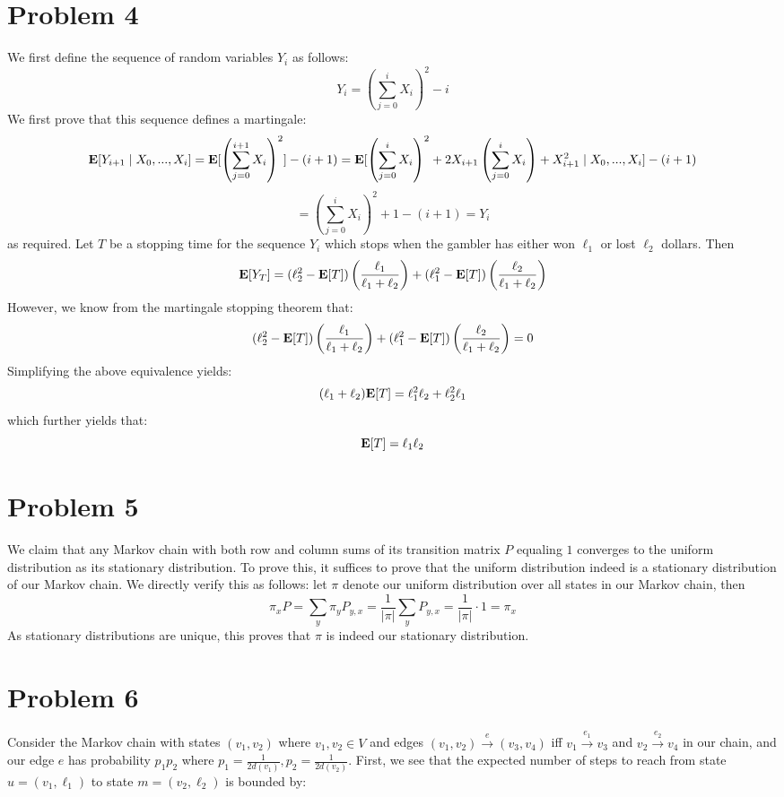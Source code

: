 \documentclass[12pt]{article}%
\begin{document}
\section*{Problem 4}
We first define the sequence of random variables $Y_i$ as follows:
$$ Y_i = \left(\sum_{j=0}^{i} X_i \right)^2 - i  $$
We first prove that this sequence defines a martingale:
$${\bf E}[Y_{i+1} \mid X_0,...,X_{i}]  =  {\bf E}[\left(\sum_{j=0}^{i+1} X_i \right)^2] - (i+1) = {\bf E}[\left(\sum_{j=0}^{i} X_i \right)^2 + 2X_{i+1}\left(\sum_{j=0}^{i} X_i \right) + X_{i+1}^2 \mid X_0,...,X_{i}] - (i+1)$$
$$ = \left(\sum_{j=0}^{i} X_i \right)^2  + 1 - (i+1) = Y_i$$
as required.
Let $T$ be a stopping time for the sequence $Y_i$ which stops when the gambler has either won $\ell_1$ or lost $\ell_2$ dollars.
Then
$$ {\bf E}[Y_T] = (\ell_2^2 - {\bf E}[T])\left(\frac{\ell_1}{\ell_1 + \ell_2}\right) + (\ell_1^2 - {\bf E}[T])\left(\frac{\ell_2}{\ell_1 + \ell_2}\right) $$
However, we know from the martingale stopping theorem that:
$$
(\ell_2^2 - {\bf E}[T])\left(\frac{\ell_1}{\ell_1 + \ell_2}\right) + (\ell_1^2 - {\bf E}[T])\left(\frac{\ell_2}{\ell_1 + \ell_2}\right) = 0$$
Simplifying the above equivalence yields:
$$ (\ell_1 + \ell_2){\bf E}[T] = \ell_1^2\ell_2 + \ell_2^2\ell_1 $$ which further yields that:
$$ {\bf E}[T] = \ell_1\ell_2$$

\section*{Problem 5}
We claim that any Markov chain with both row and column sums of its transition matrix $P$ equaling $1$ converges to the uniform distribution as its stationary distribution. To prove this, it suffices to prove that the uniform distribution indeed is a stationary distribution of our Markov chain. We directly verify this as follows: let $\pi$ denote our uniform distribution over all states in our Markov chain, then
$$ \pi_x P = \sum_{y} \pi_y P_{y,x} =\frac{1}{|\pi|}\sum_y P_{y,x} = \frac{1}{|\pi|} \cdot 1 =\pi_x$$
As stationary distributions are unique, this proves that $\pi$ is indeed our stationary distribution.

\section*{Problem 6}
Consider the Markov chain with states $(v_1,v_2)$ where $v_1, v_2 \in V$ and edges $(v_1,v_2) \xrightarrow{e} (v_3,v_4)$ iff $v_1 \xrightarrow{e_1} v_3$ and $v_2 \xrightarrow{e_2} v_4$ in our chain, and our edge $e$ has probability $p_1p_2$ where $p_1 = \frac{1}{2d(v_1)}, p_2 = \frac{1}{2d(v_2)}$.
First, we see that the expected number of steps to reach from state $ u = (v_1,\ell_1)$ to state $m = (v_2,\ell_2)$ is bounded by:
\end{document}
